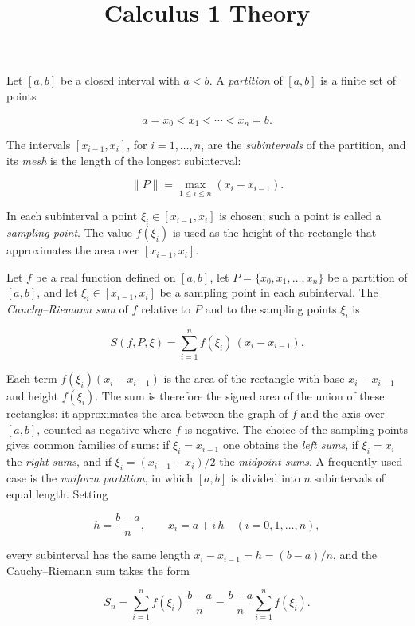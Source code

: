 \documentclass[11pt,a4paper]{article} \usepackage[T1]{fontenc}
\theoremstyle{plain} \newtheorem{theorem}{Theorem} \title{Calculus 1 Theory}
\begin{document}
\begin{definition}
[Partition] Let $[a,b]$ be a closed interval with $a<b$. A \emph{partition} of
$[a,b]$ is a finite set of points

\[
a = x_0 < x_1 < \cdots < x_n = b.
\]

The intervals $[x_{i-1},x_i]$, for $i=1,\ldots,n$, are the \emph{subintervals}
of the partition, and its \emph{mesh} is the length of the longest subinterval:

\[
\|P\| = \max_{1\le i\le n} (x_i-x_{i-1}).
\]

\end{definition}

In each subinterval a point $\xi_i\in [x_{i-1},x_i]$ is chosen; such a point is
called a \emph{sampling point}. The value $f(\xi_i)$ is used as the height of
the rectangle that approximates the area over $[x_{i-1},x_i]$.

\begin{definition}
 Let $f$ be a real function defined on $[a,b]$, let
$P=\{x_0,x_1,\ldots,x_n\}$ be a partition of $[a,b]$, and let $\xi_i\in
[x_{i-1},x_i]$ be a sampling point in each subinterval. The
\emph{Cauchy--Riemann sum} of $f$ relative to $P$ and to the sampling points
$\xi_i$ is

\[
S(f,P,\xi) = \sum_{i=1}^{n} f(\xi_i)\,(x_i-x_{i-1}).
\]

\end{definition}

Each term $f(\xi_i)(x_i-x_{i-1})$ is the area of the rectangle with base
$x_i-x_{i-1}$ and height $f(\xi_i)$. The sum is therefore the signed area of
the union of these rectangles: it approximates the area between the graph of
$f$ and the axis over $[a,b]$, counted as negative where $f$ is negative. The
choice of the sampling points gives common families of sums: if $\xi_i=x_{i-1}$
one obtains the \emph{left sums}, if $\xi_i=x_i$ the \emph{right sums}, and if
$\xi_i=(x_{i-1}+x_i)/2$ the \emph{midpoint sums}. A frequently used case is the
\emph{uniform partition}, in which $[a,b]$ is divided into $n$ subintervals of
equal length. Setting

\[
h = \frac{b-a}{n}, \qquad x_i = a + i\,h \quad (i=0,1,\ldots,n),
\]

every subinterval has the same length $x_i-x_{i-1}=h=(b-a)/n$, and the
Cauchy--Riemann sum takes the form

\[
S_n = \sum_{i=1}^{n} f(\xi_i)\,\frac{b-a}{n}
= \frac{b-a}{n}\sum_{i=1}^{n} f(\xi_i).
\]
\end{document}
